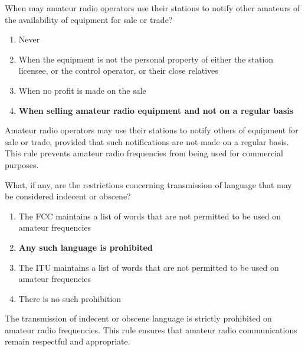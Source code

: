 \begin{tcolorbox}[colback=gray!10!white,colframe=black!75!black,title={T1D05}]
When may amateur radio operators use their stations to notify other amateurs of the availability of equipment for sale or trade?
\begin{enumerate}[label=\Alph*,noitemsep]
    \item Never
    \item When the equipment is not the personal property of either the station licensee, or the control operator, or their close relatives
    \item When no profit is made on the sale
    \item \textbf{When selling amateur radio equipment and not on a regular basis}
\end{enumerate}
\end{tcolorbox}
Amateur radio operators may use their stations to notify others of equipment for sale or trade, provided that such notifications are not made on a regular basis. This rule prevents amateur radio frequencies from being used for commercial purposes.


\begin{tcolorbox}[colback=gray!10!white,colframe=black!75!black,title={T1D06}]
What, if any, are the restrictions concerning transmission of language that may be considered indecent or obscene?
\begin{enumerate}[label=\Alph*,noitemsep]
    \item The FCC maintains a list of words that are not permitted to be used on amateur frequencies
    \item \textbf{Any such language is prohibited}
    \item The ITU maintains a list of words that are not permitted to be used on amateur frequencies
    \item There is no such prohibition
\end{enumerate}
\end{tcolorbox}
The transmission of indecent or obscene language is strictly prohibited on amateur radio frequencies. This rule ensures that amateur radio communications remain respectful and appropriate.



